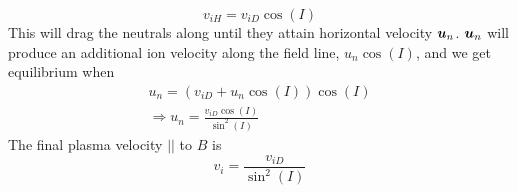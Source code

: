 \begin{equation*}
    v_{iH}=v_{iD}\cos(I)
\end{equation*}
This will drag the neutrals along until they attain horizontal velocity \(\boldsymbol{u}_n\). \(\boldsymbol{u}_n\) will produce an additional ion velocity along the field line, \(u_n\cos(I)\), and we get equilibrium when
\begin{align*}
    u_n=\left(v_{iD}+u_n\cos(I)\right)\cos(I)\\
    \Rightarrow u_n=\frac{v_{iD}\cos(I)}{\sin^2(I)}
\end{align*}
The final plasma velocity \(\vert\vert \) to \(B\) is
\begin{equation*}
    v_i=\frac{v_{iD}}{\sin^2(I)}
\end{equation*}
\begin{figure}[t]
    \centering


\end{figure}
